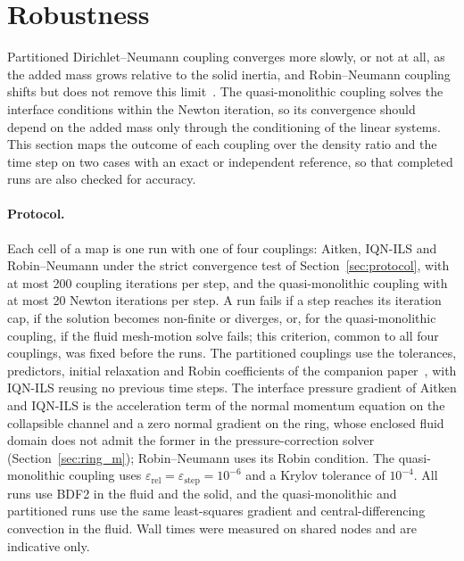 \section{Robustness}\label{sec:robustness}

Partitioned Dirichlet--Neumann coupling converges more slowly, or not at all, as the added mass grows relative to the solid inertia, and Robin--Neumann coupling shifts but does not remove this limit~\citep{Causin2005, Forster2006, Tukovic2018b}.
The quasi-monolithic coupling solves the interface conditions within the Newton iteration, so its convergence should depend on the added mass only through the conditioning of the linear systems.
This section maps the outcome of each coupling over the density ratio and the time step on two cases with an exact or independent reference, so that completed runs are also checked for accuracy.

\paragraph{Protocol.}
Each cell of a map is one run with one of four couplings: Aitken, IQN-ILS and Robin--Neumann under the strict convergence test of Section~\ref{sec:protocol}, with at most 200 coupling iterations per step, and the quasi-monolithic coupling with at most 20 Newton iterations per step.
A run fails if a step reaches its iteration cap, if the solution becomes non-finite or diverges, or, for the quasi-monolithic coupling, if the fluid mesh-motion solve fails; this criterion, common to all four couplings, was fixed before the runs.
The partitioned couplings use the tolerances, predictors, initial relaxation and Robin coefficients of the companion paper~\citep{CardiffFSIVerification2026}, with IQN-ILS reusing no previous time steps.
The interface pressure gradient of Aitken and IQN-ILS is the acceleration term of the normal momentum equation on the collapsible channel and a zero normal gradient on the ring, whose enclosed fluid domain does not admit the former in the pressure-correction solver (Section~\ref{sec:ring_m}); Robin--Neumann uses its Robin condition.
The quasi-monolithic coupling uses $\varepsilon_{\mathrm{rel}} = \varepsilon_{\mathrm{step}} = 10^{-6}$ and a Krylov tolerance of $10^{-4}$.
All runs use BDF2 in the fluid and the solid, and the quasi-monolithic and partitioned runs use the same least-squares gradient and central-differencing convection in the fluid.
Wall times were measured on shared nodes and are indicative only.


